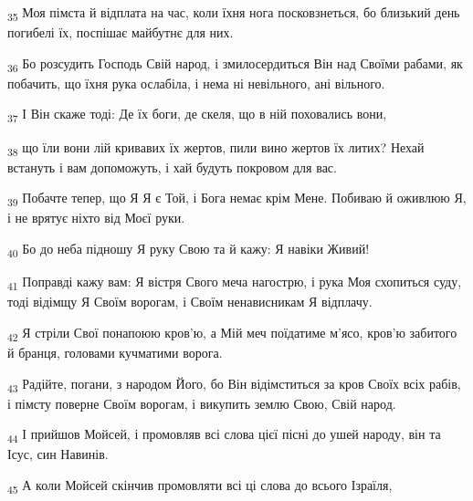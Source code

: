 \begin{tcolorbox}
\textsubscript{35} Моя пімста й відплата на час, коли їхня нога посковзнеться, бо близький день погибелі їх, поспішає майбутнє для них.
\end{tcolorbox}
\begin{tcolorbox}
\textsubscript{36} Бо розсудить Господь Свій народ, і змилосердиться Він над Своїми рабами, як побачить, що їхня рука ослабіла, і нема ні невільного, ані вільного.
\end{tcolorbox}
\begin{tcolorbox}
\textsubscript{37} І Він скаже тоді: Де їх боги, де скеля, що в ній поховались вони,
\end{tcolorbox}
\begin{tcolorbox}
\textsubscript{38} що їли вони лій кривавих їх жертов, пили вино жертов їх литих? Нехай встануть і вам допоможуть, і хай будуть покровом для вас.
\end{tcolorbox}
\begin{tcolorbox}
\textsubscript{39} Побачте тепер, що Я Я є Той, і Бога немає крім Мене. Побиваю й оживлюю Я, і не врятує ніхто від Моєї руки.
\end{tcolorbox}
\begin{tcolorbox}
\textsubscript{40} Бо до неба підношу Я руку Свою та й кажу: Я навіки Живий!
\end{tcolorbox}
\begin{tcolorbox}
\textsubscript{41} Поправді кажу вам: Я вістря Свого меча нагострю, і рука Моя схопиться суду, тоді відімщу Я Своїм ворогам, і Своїм ненависникам Я відплачу.
\end{tcolorbox}
\begin{tcolorbox}
\textsubscript{42} Я стріли Свої понапоюю кров'ю, а Мій меч поїдатиме м'ясо, кров'ю забитого й бранця, головами кучматими ворога.
\end{tcolorbox}
\begin{tcolorbox}
\textsubscript{43} Радійте, погани, з народом Його, бо Він відімститься за кров Своїх всіх рабів, і пімсту поверне Своїм ворогам, і викупить землю Свою, Свій народ.
\end{tcolorbox}
\begin{tcolorbox}
\textsubscript{44} І прийшов Мойсей, і промовляв всі слова цієї пісні до ушей народу, він та Ісус, син Навинів.
\end{tcolorbox}
\begin{tcolorbox}
\textsubscript{45} А коли Мойсей скінчив промовляти всі ці слова до всього Ізраїля,
\end{tcolorbox}
